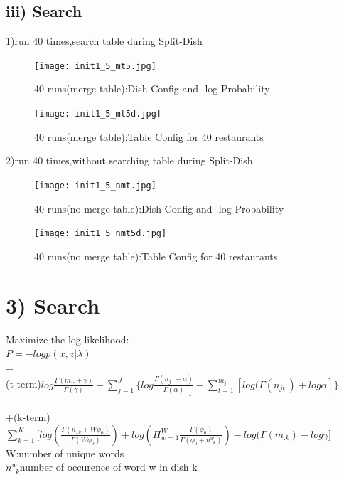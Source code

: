 \documentclass{article}
\begin{document}
\begin{spacing}{1.1}
\subsection{iii) Search}
1)run 40 times,search table during Split-Dish\\
\begin{figure}[h] 
  \begin{minipage}[b]{0.5\textwidth} 
    \centering 
    \texttt{[image: init1\_5\_mt5.jpg]} 
    \caption{40 runs(merge table):Dish Config and -log Probability}
    \label{fig:by:table} 
  \end{minipage}%
  \begin{minipage}[b]{0.5\textwidth} 
    \centering 
    \texttt{[image: init1\_5\_mt5d.jpg]} 
    \caption{40 runs(merge table):Table Config for 40 restaurants}
    \label{fig:by:table}  
   \end{minipage}%
\end{figure}
2)run 40 times,without searching table during Split-Dish\\
\begin{figure}[h] 
  \begin{minipage}[b]{0.5\textwidth} 
    \centering 
    \texttt{[image: init1\_5\_nmt.jpg]} 
    \caption{40 runs(no merge table):Dish Config and -log Probability}
    \label{fig:by:table} 
  \end{minipage}%
  \begin{minipage}[b]{0.5\textwidth} 
    \centering 
    \texttt{[image: init1\_5\_nmt5d.jpg]} 
    \caption{40 runs(no merge table):Table Config for 40 restaurants}
    \label{fig:by:table}  
   \end{minipage}%
\end{figure}



\section{3) Search}
Maximize the log likelihood:\\
$P=-log p(x,z|\lambda)$\\ =\\
(t-term)$ \underline{log \frac{\Gamma(m..+\gamma)}{\Gamma(\gamma)}+\sum_{j=1}^{J} \{log \frac{\Gamma(n_{j..}+\alpha)}{\Gamma(\alpha)}-\sum_{t=1}^{m_{j.}}[log(\Gamma(n_{jt.})+log \alpha
]\}}$\\ \\
+(k-term)$ \sum_{k=1}^{K} [log(\frac{\Gamma(n_{..k}+W\phi_{0})}{\Gamma(W\phi_{0})})+log(\Pi_{w=1}^{W}\frac{\Gamma(\phi_{0})}{\Gamma(\phi_{0}+n_{..k}^{w})})
-\underline{log(\Gamma(m_{.k})-log \gamma]}$\\ W:number of unique words\\ 
$n_{..k}^{w}$number of occurence of word w in dish k \\ \\ \\ 



\end{spacing}
\end{document}
